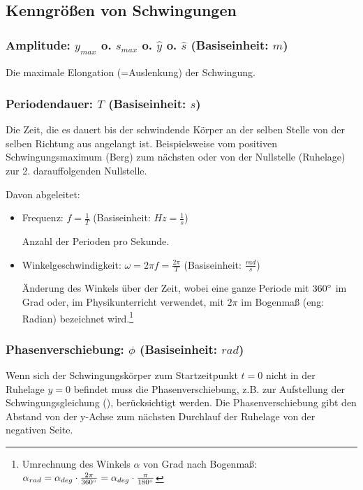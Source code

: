 \subsection{Kenngrößen von Schwingungen} \label{subsec:kenngroessen_schwingungen}


\subsubsection[Amplitude]{Amplitude: $y_{max}$ o. $s_{max}$ o. $\hat{y}$ o. $\hat{s}$ (Basiseinheit: $m$)}

Die maximale Elongation (=\glqq Auslenkung\grqq) der Schwingung.


\subsubsection[Periodendauer]{Periodendauer: $T$ (Basiseinheit: $s$)}
	
Die Zeit, die es dauert bis der schwindende Körper an der selben Stelle von der selben Richtung aus angelangt ist. Beispielsweise vom positiven Schwingungsmaximum (\glqq Berg\grqq) zum nächsten oder von der Nullstelle (\glqq Ruhelage\grqq) zur 2. darauffolgenden Nullstelle.

Davon abgeleitet:
\begin{itemize}
	\item Frequenz: $f=\frac{1}{T}$ (Basiseinheit: $Hz=\frac{1}{s}$)
	
	Anzahl der Perioden pro Sekunde.
	\item Winkelgeschwindigkeit: $\omega=2 \pi f=\frac{2 \pi}{T}$ (Basiseinheit: $\frac{rad}{s}$)
		
	Änderung des Winkels über der Zeit, wobei eine ganze Periode mit $360 \degree$ im Grad oder, im Physikunterricht verwendet, mit $2 \pi$ im Bogenmaß (eng: \glqq Radian\grqq) bezeichnet wird.\footnote{Umrechnung des Winkels $\alpha$ von Grad nach Bogenmaß: $\alpha_{rad} = \alpha_{deg} \cdot \frac{2\pi}{360 \degree} = \alpha_{deg} \cdot \frac{\pi}{180 \degree} $}
\end{itemize}


\subsubsection[Phasenverschiebung]{Phasenverschiebung: $\phi$ (Basiseinheit: $rad$)}
	
Wenn sich der Schwingungskörper zum Startzeitpunkt $t=0$ nicht in der Ruhelage $y=0$ befindet muss die Phasenverschiebung, z.B. zur Aufstellung der Schwingungsgleichung (), berücksichtigt werden. Die Phasenverschiebung gibt den Abstand von der y-Achse zum nächsten Durchlauf der Ruhelage von der negativen Seite.

